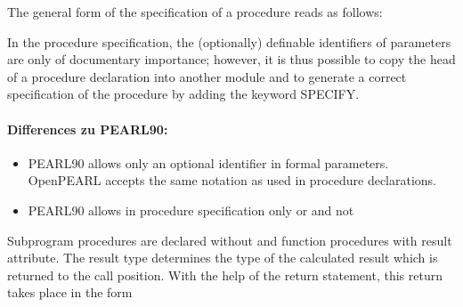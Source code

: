 \begin{grammarframe}





\end{grammarframe}

The general form of the specification of a procedure reads as follows:

\begin{grammarframe}
\end{grammarframe}

In the procedure specification, the (optionally) definable identifiers of
parameters are only of documentary importance; however, it is thus
possible to copy the head of a procedure declaration into another module
and to generate a correct specification of the procedure by adding the
keyword SPECIFY.

\paragraph{Differences zu PEARL90:}
\begin{itemize}
\item PEARL90 allows only an optional identifier in formal parameters. OpenPEARL accepts the same notation as used in procedure declarations.
\item PEARL90 allows in procedure specification only  or  and not 
\end{itemize}


Subprogram procedures are declared without and function procedures with
result attribute. The result type determines the type of the calculated
result which is returned to the call position. With the help of the
return statement, this return takes place in the form

